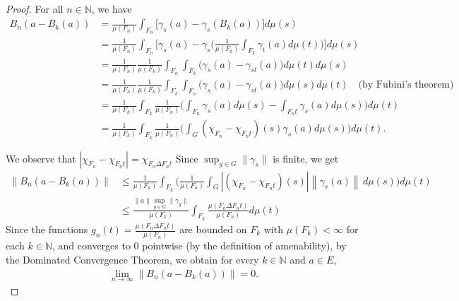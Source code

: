 \documentclass[11pt]{amsart}
\theoremstyle{definition}
\theoremstyle{myremark}
\numberwithin{equation}{section}
\def\N{\mathbb N}
\newcommand{\CM}{\mathcal{M}}
\newcommand{\abs}[1]{\left\vert#1\right\vert}
\newcommand{\norm}[1]{\left\Vert#1\right\Vert}
\begin{document}
		\begin{proof}
			For all $n \in \N$, we have
			\begin{align*}
				B_n(a - B_k(a)) 
				&= \frac{1}{\mu(F_{n})} \int_{F_{n}} \Big[ \gamma_s(a) - \gamma_s (B_k(a)) \Big] d\mu(s) \\
				&= \frac{1}{\mu(F_{n})} \int_{F_{n}} \Bigg[ \gamma_s (a) - \gamma_s \bigg( \frac{1}{\mu(F_{k})} \int_{F_{k}} \gamma_t (a) d\mu(t) \bigg) \Bigg] d\mu(s) \\
				&= \frac{1}{\mu(F_{n})} \frac{1}{\mu(F_{k})} \int_{F_{n}} \int_{F_{k}}  \Big( \gamma_s (a)- \gamma_{st}(a) \Big) d\mu(t) d\mu(s) \\
				&= \frac{1}{\mu(F_{n})} \frac{1}{\mu(F_{k})} \int_{F_{k}} \int_{F_{n}}  \Big( \gamma_s (a)- \gamma_{st}(a) \Big) d\mu(s) d\mu(t) \quad \text{(by Fubini's theorem)} \\
				&= \frac{1}{\mu(F_{k})} \int_{F_{k}} \frac{1}{\mu(F_{n})} \Bigg( \int_{F_{n}}   \gamma_s (a)d\mu(s)- \int_{F_{n}t} \gamma_s (a)d\mu(s) \Bigg) d\mu(t)\\
                &= \frac{1}{\mu(F_{k})} \int_{F_{k}} \frac{1}{\mu(F_{n})} \Bigg( \int_{G}(\chi_{F_{n}}-\chi_{F_{n}t})(s)\gamma_s (a)d\mu(s) \Bigg) d\mu(t).
			\end{align*}
			
		\noindent We observe that $\abs{\chi_{F_{n}}-\chi_{F_{n}t}}=\chi_{F_{n}\Delta F_{n}t}$ Since $\sup_{g \in G}\|\gamma_{s}\|$ is finite, we  get 
        \begin{align*}
 \left\| B_n(a - B_k(a)) \right\| &\leq   \frac{1}{\mu(F_k)} \int_{F_k} \Big( \frac{1}{\mu(F_n)} \int_{G} \abs{(\chi_{F_n}- \chi_{F_n t})(s)} \left\|\gamma_s(a)\right\| \, d\mu(s)\Big)d\mu(t)  \\
&\le \frac{ \| a \|\sup_{g \in G}\| \gamma_g \| }{\mu(F_{k})}\int_{F_k}\frac{\mu(F_n \Delta F_n t) }{\mu(F_{n})}d\mu(t)
\end{align*}
Since the functions $g_{n}(t)=\frac{\mu(F_n \Delta F_n t)}{\mu(F_{n})}$ are bounded on $F_{k}$ with $\mu(F_k) < \infty$ for each $k\in \mathbb{N}$, and converges to 0 pointwise (by the definition of amenability), by the Dominated Convergence Theorem,  we obtain for every $k \in \mathbb{N}$ and  $a \in E$,
\begin{align*}
\lim_{n \rightarrow \infty}\left\| B_n(a - B_k(a)) \right\|=0.
\end{align*}
		\end{proof}
		
		
		

\end{document}
